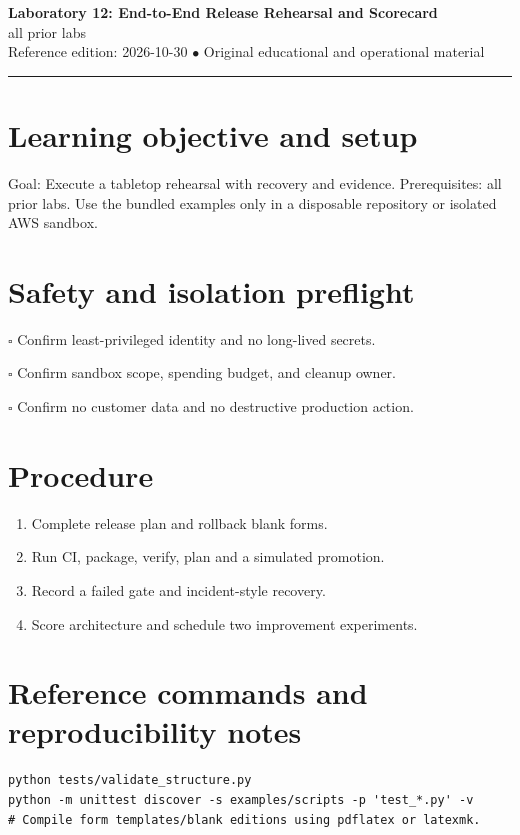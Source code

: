 \documentclass[10pt,letterpaper]{article}
\begin{document}
\begin{center}
{\LARGE\bfseries\color{cdblue}Laboratory 12: End-to-End Release Rehearsal and Scorecard}\\[7pt]
{\large all prior labs}\\[6pt]
{\small Reference edition: 2026-10-30 $\bullet$ Original educational and operational material}
\end{center}
\noindent\color{cdblue}\rule{\linewidth}{1.2pt}\color{black}
\vspace{0.4em}
\section{Learning objective and setup}
Goal: Execute a tabletop rehearsal with recovery and evidence. Prerequisites: all prior labs. Use the bundled examples only in a disposable repository or isolated AWS sandbox.


\section{Safety and isolation preflight}
\noindent $\square$ Confirm least-privileged identity and no long-lived secrets.\par\vspace{0.35em}
\noindent $\square$ Confirm sandbox scope, spending budget, and cleanup owner.\par\vspace{0.35em}
\noindent $\square$ Confirm no customer data and no destructive production action.\par\vspace{0.35em}

\section{Procedure}
\begin{enumerate}
\item Complete release plan and rollback blank forms.
\item Run CI, package, verify, plan and a simulated promotion.
\item Record a failed gate and incident-style recovery.
\item Score architecture and schedule two improvement experiments.
\end{enumerate}

\section{Reference commands and reproducibility notes}
\begin{verbatim}
python tests/validate_structure.py
python -m unittest discover -s examples/scripts -p 'test_*.py' -v
# Compile form templates/blank editions using pdflatex or latexmk.
\end{verbatim}
\end{document}
